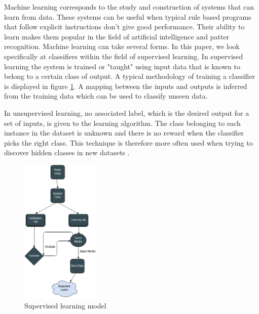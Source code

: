 Machine learning corresponds to the study and construction of systems that can learn from data. These systems can be useful when typical rule based programs that follow explicit instructions don't give good performance. Their ability to learn makes them popular in the field of artificial intelligence and patter recognition. Machine learning can take several forms. In this paper, we look specifically at classifiers within the field of supervised learning. In supervised learning the system is trained or "taught" using input data that is known to belong to a certain class of output. A typical methodology of training a classifier is displayed in figure \ref{fig:SL}. A mapping between the inputs and outputs is inferred from the training data which can be used to classify unseen data. \cite{cord2008machine}

In unsupervised learning, no associated label, which is the desired output for a set of inputs, is given to the learning algorithm. The class belonging to each instance in the dataset is unknown and there is no reward when the classifier picks the right class. This technique is therefore more often used when trying to discover hidden classes in new datasets \cite{maglogiannis2007emerging}.


\begin{figure}[H]
\centering
    \includegraphics[width=38mm,scale=0.3]{./img/SL.png}
    \caption{\footnotesize{Supervised learning model}}
    \label{fig:SL}
\end{figure}



